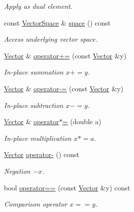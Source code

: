 \begin{DoxyCompactItemize}
\begin{DoxyCompactList}\small\item\em Apply as dual element. \end{DoxyCompactList}\item 
const \hyperlink{classSpacy_1_1VectorSpace}{Vector\+Space} \& \hyperlink{classSpacy_1_1VectorBase_aa999dbf9d679d895dfe04c10fbf9f5e9}{space} () const \hypertarget{classSpacy_1_1VectorBase_aa999dbf9d679d895dfe04c10fbf9f5e9}{}\label{classSpacy_1_1VectorBase_aa999dbf9d679d895dfe04c10fbf9f5e9}

\begin{DoxyCompactList}\small\item\em Access underlying vector space. \end{DoxyCompactList}\item 
\hyperlink{classSpacy_1_1FEniCS_1_1Vector}{Vector} \& \hyperlink{classSpacy_1_1AddArithmeticOperators_afad1d01e1e8c6f75290ac46d9b047ea8}{operator+=} (const \hyperlink{classSpacy_1_1FEniCS_1_1Vector}{Vector} \&y)
\begin{DoxyCompactList}\small\item\em In-\/place summation $ x+=y$. \end{DoxyCompactList}\item 
\hyperlink{classSpacy_1_1FEniCS_1_1Vector}{Vector} \& \hyperlink{classSpacy_1_1AddArithmeticOperators_a9fa91e177d13203cfe8cfa991c64ca36}{operator-\/=} (const \hyperlink{classSpacy_1_1FEniCS_1_1Vector}{Vector} \&y)
\begin{DoxyCompactList}\small\item\em In-\/place subtraction $ x-=y$. \end{DoxyCompactList}\item 
\hyperlink{classSpacy_1_1FEniCS_1_1Vector}{Vector} \& \hyperlink{classSpacy_1_1AddArithmeticOperators_a1d3db95b24fd2bc1de712c9e04c47e2f}{operator$\ast$=} (double a)
\begin{DoxyCompactList}\small\item\em In-\/place multiplication $ x*=a$. \end{DoxyCompactList}\item 
\hyperlink{classSpacy_1_1FEniCS_1_1Vector}{Vector} \hyperlink{classSpacy_1_1AddArithmeticOperators_a5acd030bf265d130983fd6e3c5b68be5}{operator-\/} () const
\begin{DoxyCompactList}\small\item\em Negation $ -x$. \end{DoxyCompactList}\item 
bool \hyperlink{classSpacy_1_1AddArithmeticOperators_a5ff1909f49f4a705d69663dc2d4b6316}{operator==} (const \hyperlink{classSpacy_1_1FEniCS_1_1Vector}{Vector} \&y) const
\begin{DoxyCompactList}\small\item\em Comparison operator $ x==y$. \end{DoxyCompactList}\end{DoxyCompactItemize}

